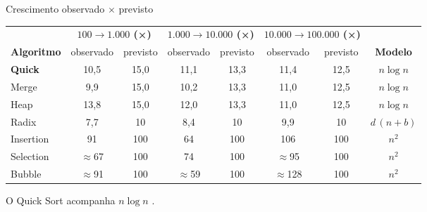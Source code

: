 \documentclass[aspectratio=169,10pt]{beamer}
\begin{document}
\begin{frame}{Crescimento observado $\times$ previsto}
 \centering\footnotesize
 \renewcommand{\arraystretch}{1.3}
 \begin{tabular}{@{}lccccccc@{}}
  \toprule
  & \multicolumn{2}{c}{\textbf{$100\to1.000$ (×)}} & \multicolumn{2}{c}{\textbf{$1.000\to10.000$ (×)}} & \multicolumn{2}{c}{\textbf{$10.000\to100.000$ (×)}} \\
  \cmidrule(lr){2-3}\cmidrule(lr){4-5}\cmidrule(lr){6-7}
  \textbf{Algoritmo} & observado & previsto & observado & previsto & observado & previsto & \textbf{Modelo}\\
  \midrule
  \textbf{Quick} & 10,5 & 15,0 & 11,1 & 13,3 & 11,4 & 12,5 & $n\log n$\\
  Merge & 9,9 & 15,0 & 10,2 & 13,3 & 11,0 & 12,5 & $n\log n$\\
  Heap & 13,8 & 15,0 & 12,0 & 13,3 & 11,0 & 12,5 & $n\log n$\\
  Radix & 7,7 & 10 & 8,4 & 10 & 9,9 & 10 & $d\,(n+b)$\\
  Insertion & 91 & 100 & 64 & 100 & 106 & 100 & $n^2$\\
  Selection & $\approx$67 & 100 & 74 & 100 & $\approx$95 & 100 & $n^2$\\
  Bubble & $\approx$91 & 100 & $\approx$59 & 100 & $\approx$128 & 100 & $n^2$\\
  \bottomrule
 \end{tabular}
 \par\vspace{0.7em}
 {\scriptsize %
 O Quick Sort acompanha $n\log n$ \cite{clrs22}.}
\end{frame}
\end{document}
